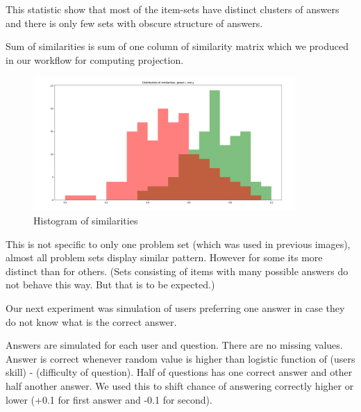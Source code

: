 \documentclass[
  digital, %
  table,   %
  nolof,     %
  nolot,     %
  nocover
]{fithesis3}
\begin{document}
This statistic show that most of the item-sets have distinct clusters of answers and there is only few sets with obscure structure of answers.


Sum of similarities is sum of one column of similarity matrix which we
produced in our workflow for computing projection.

\begin{figure}
  \begin{center}
    \includegraphics[width=10cm]{img/iy_histogram}
  \end{center}
  \caption{Histogram of similarities}
  \label{ref:iyhistogram}
\end{figure}



This is not specific to only one problem set (which was used in previous
images), almost all problem sets display similar pattern. However for
some its more distinct than for others. (Sets consisting of items with
many possible answers do not behave this way. But that is to be
expected.)


Our next experiment was simulation of users preferring one answer in
case they do not know what is the correct answer.

Answers are simulated for each user and question. There are no missing
values. Answer is correct whenever random value is higher than logistic
function of (users skill) - (difficulty of question). Half of questions
has one correct answer and other half another answer. We used this to
shift chance of answering correctly higher or lower (+0.1 for first
answer and -0.1 for second).

\end{document}
